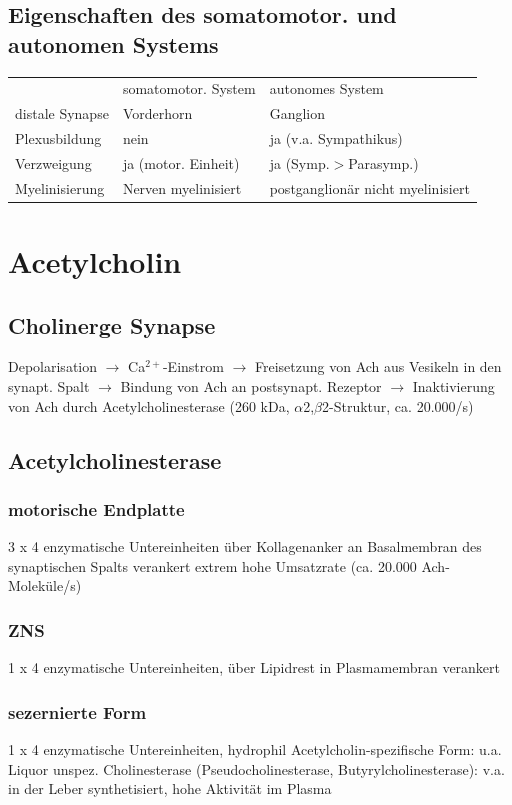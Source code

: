 \documentclass[10pt,a4paper]{report}
\begin{document}
\subsection{Eigenschaften des somatomotor. und autonomen Systems}
\begin{tabularx}{\textwidth}{XXX}
&somatomotor. System&autonomes System\\
distale Synapse&Vorderhorn&	Ganglion\\
Plexusbildung&nein&ja (v.a. Sympathikus)\\
Verzweigung&ja (motor. Einheit)&ja (Symp.$>$Parasymp.)\\
Myelinisierung&Nerven myelinisiert&postganglionär nicht myelinisiert\\
\end{tabularx}
\section{Acetylcholin}
\subsection{Cholinerge Synapse}
Depolarisation $\rightarrow$ Ca$^{2+}$-Einstrom $\rightarrow$ 	Freisetzung von Ach aus Vesikeln in den synapt. Spalt $\rightarrow$ Bindung von Ach an postsynapt. Rezeptor $\rightarrow$ Inaktivierung von Ach durch Acetylcholinesterase (260 kDa, $\alpha$2,$\beta$2-Struktur, ca. 20.000/s)
\subsection{Acetylcholinesterase}
\subsubsection{motorische Endplatte}
3 x 4 enzymatische Untereinheiten über Kollagenanker an Basalmembran des synaptischen Spalts verankert extrem hohe Umsatzrate (ca. 20.000 Ach-Moleküle/s)
\subsubsection{ZNS}
1 x 4 enzymatische Untereinheiten, über Lipidrest in Plasmamembran verankert
\subsubsection{sezernierte Form} 
1 x 4 enzymatische Untereinheiten, hydrophil
Acetylcholin-spezifische Form: u.a. Liquor
unspez. Cholinesterase (Pseudocholinesterase, Butyrylcholinesterase): v.a. in der Leber synthetisiert, hohe Aktivität im Plasma
\end{document}
